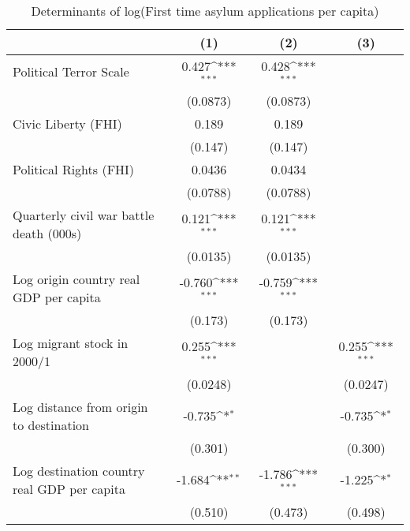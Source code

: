 \begin{table}[htbp]\centering
\def\sym#1{\ifmmode^{#1}\else\(^{#1}\)\fi}
\caption{Determinants of log(First time asylum applications per capita)}
\begin{tabular}{l*{3}{c}}
\hline\hline
                    &\multicolumn{1}{c}{(1)}         &\multicolumn{1}{c}{(2)}         &\multicolumn{1}{c}{(3)}         \\
\hline
Political Terror Scale&       0.427\sym{***}&       0.428\sym{***}&                     \\
                    &    (0.0873)         &    (0.0873)         &                     \\
[1em]
Civic Liberty (FHI) &       0.189         &       0.189         &                     \\
                    &     (0.147)         &     (0.147)         &                     \\
[1em]
Political Rights (FHI)&      0.0436         &      0.0434         &                     \\
                    &    (0.0788)         &    (0.0788)         &                     \\
[1em]
Quarterly civil war battle death (000s)&       0.121\sym{***}&       0.121\sym{***}&                     \\
                    &    (0.0135)         &    (0.0135)         &                     \\
[1em]
Log origin country real GDP per capita&      -0.760\sym{***}&      -0.759\sym{***}&                     \\
                    &     (0.173)         &     (0.173)         &                     \\
[1em]
Log migrant stock in 2000/1&       0.255\sym{***}&                     &       0.255\sym{***}\\
                    &    (0.0248)         &                     &    (0.0247)         \\
[1em]
Log distance from origin to destination&      -0.735\sym{*}  &                     &      -0.735\sym{*}  \\
                    &     (0.301)         &                     &     (0.300)         \\
[1em]
Log destination country real GDP per capita&      -1.684\sym{**} &      -1.786\sym{***}&      -1.225\sym{*}  \\
                    &     (0.510)         &     (0.473)         &     (0.498)         \\

\end{tabular}
\end{table}
